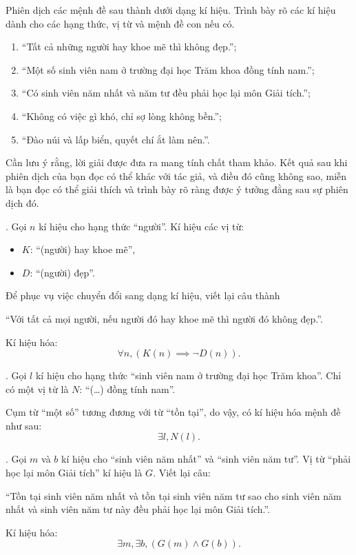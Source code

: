 \exercise
Phiên dịch các mệnh đề sau thành dưới dạng kí hiệu. Trình bày rõ các kí hiệu dành cho các hạng thức, vị từ và mệnh đề con nếu có.
\begin{enumerate}
    \item ``Tất cả những người hay khoe mẽ thì không đẹp.'';
    \item ``Một số sinh viên nam ở trường đại học Trăm khoa đồng tính nam.'';
    \item ``Có sinh viên năm nhất và năm tư đều phải học lại môn Giải tích.'';
    \item ``Không có việc gì khó, chỉ sợ lòng không bền.'';
    \item ``Đào núi và lấp biển, quyết chí ắt làm nên.''.
\end{enumerate}

\solution

Cần lưu ý rằng, lời giải được đưa ra mang tính chất tham khảo. Kết quả sau khi phiên dịch của bạn đọc có thể khác với tác giả, và điều đó cũng không sao, miễn là bạn đọc có thể giải thích và trình bày rõ ràng được ý tưởng đằng sau sự phiên dịch đó.

\setcounter{subexercise}{1}
. Gọi $n$ kí hiệu cho hạng thức ``người''. Kí hiệu các vị từ:
\begin{itemize}
    \item $K$: ``(người) hay khoe mẽ'',
    \item $D$: ``(người) đẹp''.
\end{itemize}
Để phục vụ việc chuyển đổi sang dạng kí hiệu, viết lại câu thành
\begin{center}
    ``Với tất cả mọi người, nếu người đó hay khoe mẽ thì người đó không đẹp.''.
\end{center}
Kí hiệu hóa:
\begin{equation}
   \forall n, (K(n) \implies \neg D(n)). \label{eq:nen_tang_lo_gich:giai_tich_vi_tu_bac_nhat:thanh_to_cau_tao:ex-1}
\end{equation}

. Gọi $l$ kí hiệu cho hạng thức ``sinh viên nam ở trường đại học Trăm khoa''. Chỉ có một vị từ là $N$: ``(\dots) đồng tính nam''.

Cụm từ ``một số'' tương đương với từ ``tồn tại'', do vậy, có kí hiệu hóa mệnh đề như sau:
\begin{equation*}
    \exists l, N(l).
\end{equation*}

. Gọi $m$ và $b$ kí hiệu cho ``sinh viên năm nhất'' và ``sinh viên năm tư''. Vị từ ``phải học lại môn Giải tích'' kí hiệu là $G$. Viết lại câu:
\begin{center}
    ``Tồn tại sinh viên năm nhất và tồn tại sinh viên năm tư sao cho sinh viên năm nhất và sinh viên năm tư này đều phải học lại môn Giải tích.''.
\end{center}
Kí hiệu hóa:
\begin{equation*}
    \exists m, \exists b, (G(m) \land G(b)).
\end{equation*}


